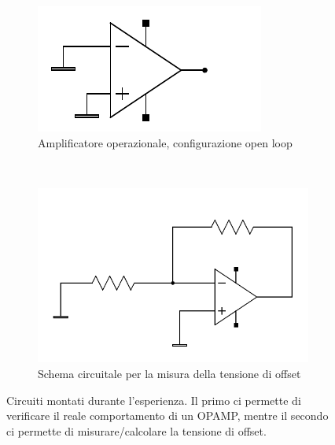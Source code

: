 \begin{figure}[h]
        \centering
        \begin{subfigure}[b]{0.48\textwidth}
                \includegraphics[width=\textwidth]{../figure/v_offset_exists.pdf}
                \caption{Amplificatore operazionale, configurazione open loop}
                \label{fig:open_loop}
        \end{subfigure}
        ~
        \begin{subfigure}[b]{0.48\textwidth}
                \includegraphics[width=\textwidth]{../figure/v_offset.pdf}
                \caption{Schema circuitale per la misura della tensione di offset}
                \label{fig:offset}
        \end{subfigure}
        \caption{Circuiti montati durante l'esperienza. Il primo ci permette di verificare il reale comportamento di un OPAMP, mentre il secondo ci permette di misurare/calcolare la tensione di offset.}
        \label{fig:circuits}
\end{figure}
